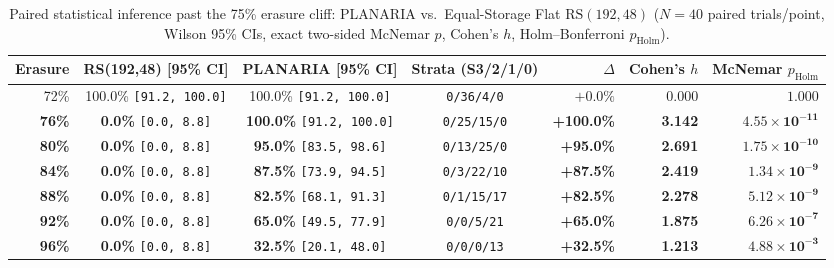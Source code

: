 \documentclass[11pt,letterpaper]{article}
\theoremstyle{remark}
\begin{document}
\begin{table}[ht]
\centering
\caption{Paired statistical inference past the 75\% erasure cliff: PLANARIA vs.\ Equal-Storage Flat $\mathrm{RS}(192,48)$ ($N=40$ paired trials/point, Wilson 95\% CIs, exact two-sided McNemar $p$, Cohen's $h$, Holm--Bonferroni $p_{\text{Holm}}$).}
\label{tab:stats}
\scriptsize
\setlength{\tabcolsep}{3.5pt}
\begin{tabular}{@{} r c c c r r r @{}}
\toprule
\textbf{Erasure} & \textbf{RS(192,48) [95\% CI]} & \textbf{PLANARIA [95\% CI]} & \textbf{Strata (S3/2/1/0)} & $\Delta$ & \textbf{Cohen's $h$} & \textbf{McNemar $p_{\text{Holm}}$} \\
\midrule
72\% & 100.0\% \texttt{[91.2, 100.0]} & 100.0\% \texttt{[91.2, 100.0]} & \texttt{0/36/4/0}  & $+0.0\%$   & 0.000 & $1.000$ \\
\textbf{76\%} & \textbf{0.0\%} \texttt{[0.0, 8.8]} & \textbf{100.0\%} \texttt{[91.2, 100.0]} & \texttt{0/25/15/0} & \textbf{+100.0\%} & \textbf{3.142} & $\mathbf{4.55\times 10^{-11}}$ \\
\textbf{80\%} & \textbf{0.0\%} \texttt{[0.0, 8.8]} & \textbf{95.0\%}  \texttt{[83.5, 98.6]}  & \texttt{0/13/25/0} & \textbf{+95.0\%}  & \textbf{2.691} & $\mathbf{1.75\times 10^{-10}}$ \\
\textbf{84\%} & \textbf{0.0\%} \texttt{[0.0, 8.8]} & \textbf{87.5\%}  \texttt{[73.9, 94.5]}  & \texttt{0/3/22/10} & \textbf{+87.5\%}  & \textbf{2.419} & $\mathbf{1.34\times 10^{-9}}$ \\
\textbf{88\%} & \textbf{0.0\%} \texttt{[0.0, 8.8]} & \textbf{82.5\%}  \texttt{[68.1, 91.3]}  & \texttt{0/1/15/17} & \textbf{+82.5\%}  & \textbf{2.278} & $\mathbf{5.12\times 10^{-9}}$ \\
\textbf{92\%} & \textbf{0.0\%} \texttt{[0.0, 8.8]} & \textbf{65.0\%}  \texttt{[49.5, 77.9]}  & \texttt{0/0/5/21}  & \textbf{+65.0\%}  & \textbf{1.875} & $\mathbf{6.26\times 10^{-7}}$ \\
\textbf{96\%} & \textbf{0.0\%} \texttt{[0.0, 8.8]} & \textbf{32.5\%}  \texttt{[20.1, 48.0]}  & \texttt{0/0/0/13}  & \textbf{+32.5\%}  & \textbf{1.213} & $\mathbf{4.88\times 10^{-3}}$ \\
\bottomrule
\end{tabular}
\end{table}
\end{document}
